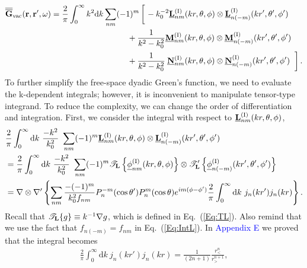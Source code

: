 \documentclass[journal=jacsat,manuscript=article,layout=traditional]{achemso}
\newcommand*\diff{\mathrm{d}}
\newcommand*\br{\mathbf{r}}
\newcommand*\blue[1]{\textcolor{blue}{#1}}
\newcommand*\tensorg{\overline{\overline{\mathbf{G}}}}
\newcommand{\norF}[1]{\underline{\vb{#1}}}
\newcommand{\RomanI}{\scriptsize\textrm{I}}
\begin{document}
\begin{align}
    \nonumber
    \tensorg_\mathrm{vac}(\br,\br',\omega)=\frac{2}{\pi}\int_0^\infty k^2\mathrm{d}k
    \sum_{nm}&(-1)^m
    \left[\vphantom{\frac{a^2}{b^2}}\right.
    -k_0^{-2}\norF{L}_{nm}^{(\RomanI)}(kr,\theta,\phi) \otimes
    \norF{L}_{n(-m)}^{(\RomanI)}(kr',\theta',\phi')\\
    \nonumber
    &~~~~+
    \frac{1}{k^2-k_0^2}\norF{M}_{nm}^{(\RomanI)}(kr,\theta,\phi) \otimes 
    \norF{M}_{n(-m)}^{(\RomanI)}(kr',\theta',\phi')\\
    &~~~~+
    \frac{1}{k^2-k_0^2}\hspace{.08cm}\norF{N}_{nm}^{(\RomanI)}(kr,\theta,\phi) \otimes
    \norF{N}_{n(-m)}^{(\RomanI)}(kr',\theta',\phi')
    \hspace{.1cm}\left.\vphantom{\frac{a^2}{b^2}}\right].
    \label{Eq:G0IntLMN}
\end{align}
To further simplify the free-space dyadic Green's function, we need to evaluate the k-dependent integrals; however, it is inconvenient to manipulate tensor-type integrand.
To reduce the complexity, we can change the order of differentiation and integration.
First, we consider the integral with respect to $\norF{L}_{nm}^{(\RomanI)}(kr,\theta,\phi)$,
\begin{align}
    \nonumber
        &\frac{2}{\pi}\int_0^{\infty}\diff{k}~\frac{-k^2}{k_0^{2}}~\sum_{nm}(-1)^m
        \norF{L}_{nm}^{(\RomanI)}(kr,\theta,\phi) \otimes
        \norF{L}_{n(-m)}^{(\RomanI)}(kr',\theta',\phi')\\
        \nonumber
        &=
        \frac{2}{\pi}\int_0^{\infty}\diff{k}~\frac{-k^2}{k_0^{2}}~\sum_{nm}(-1)^m
        \mathcal{T}_{\vb{L}}
        \left\{\vphantom{\underline{\phi}_{n(-m)}^{(\RomanI)}}
        \underline{\phi}_{nm}^{(\RomanI)}(kr,\theta,\phi)\right\}\otimes
        \mathcal{T}_{\vb{L}}'
        \left\{\underline{\phi}_{n(-m)}^{(\RomanI)}(kr',\theta',\phi')\right\}\\
        &=
        \nabla\otimes\nabla'
        \left\{\sum_{nm}\frac{-(-1)^m}{k_0^{2}f_{nm}}
        P_n^{-m}(\cos\theta')P_n^m(\cos\theta)
        e^{im(\phi-\phi')}
        \frac{2}{\pi}\int_0^{\infty}\diff{k}~
        j_n(kr')j_n(kr)\right\}.
        \label{Eq:IntL}
\end{align}
Recall that $\mathcal{T}_{\vb{L}}\{g\}\equiv k^{-1}\nabla g$, which is defined in Eq.~(\ref{Eq:TL}).
Also remind that we use the fact that $f_{n(-m)}=f_{nm}$ in Eq.~(\ref{Eq:IntL}).
In \blue{Appendix E} we proved that the integral becomes
\begin{align}
    \label{Eq:ContourIntL}
    \frac{2}{\pi}\int_0^{\infty}\diff{k}~j_n(kr')j_n(kr)
    =\frac{1}{(2n+1)}\frac{r_<^n}{r_>^{n+1}},
\end{align}
\end{document}
